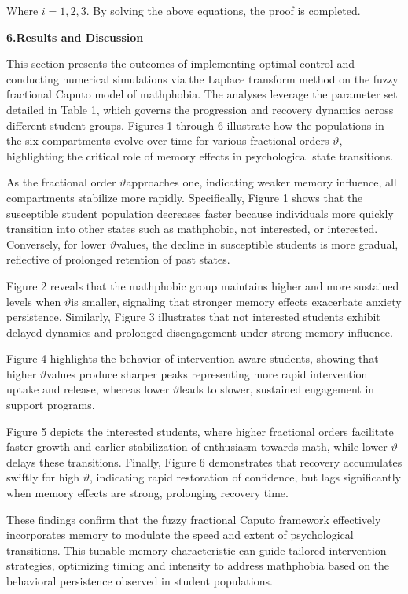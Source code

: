 \documentclass[
]{article}
\begin{document}
Where \(i = 1,2,3\). By solving the above equations, the proof is completed.

\textbf{6.Results and Discussion}

This section presents the outcomes of implementing optimal control and conducting numerical simulations via the Laplace transform method on the fuzzy fractional Caputo model of mathphobia. The analyses leverage the parameter set detailed in Table 1, which governs the progression and recovery dynamics across different student groups. Figures 1 through 6 illustrate how the populations in the six compartments evolve over time for various fractional orders \(\vartheta\), highlighting the critical role of memory effects in psychological state transitions.

As the fractional order \(\vartheta\)approaches one, indicating weaker memory influence, all compartments stabilize more rapidly. Specifically, Figure 1 shows that the susceptible student population decreases faster because individuals more quickly transition into other states such as mathphobic, not interested, or interested. Conversely, for lower \(\vartheta\)values, the decline in susceptible students is more gradual, reflective of prolonged retention of past states.

Figure 2 reveals that the mathphobic group maintains higher and more sustained levels when \(\vartheta\)is smaller, signaling that stronger memory effects exacerbate anxiety persistence. Similarly, Figure 3 illustrates that not interested students exhibit delayed dynamics and prolonged disengagement under strong memory influence.

Figure 4 highlights the behavior of intervention-aware students, showing that higher \(\vartheta\)values produce sharper peaks representing more rapid intervention uptake and release, whereas lower \(\vartheta\)leads to slower, sustained engagement in support programs.

Figure 5 depicts the interested students, where higher fractional orders facilitate faster growth and earlier stabilization of enthusiasm towards math, while lower \(\vartheta\)delays these transitions. Finally, Figure 6 demonstrates that recovery accumulates swiftly for high \(\vartheta\), indicating rapid restoration of confidence, but lags significantly when memory effects are strong, prolonging recovery time.

These findings confirm that the fuzzy fractional Caputo framework effectively incorporates memory to modulate the speed and extent of psychological transitions. This tunable memory characteristic can guide tailored intervention strategies, optimizing timing and intensity to address mathphobia based on the behavioral persistence observed in student populations.
\end{document}
